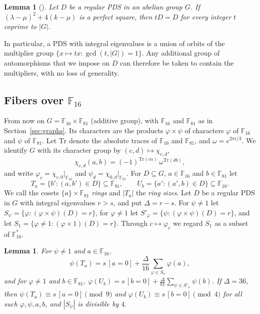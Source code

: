 \documentclass[11pt]{amsart}
\newtheorem{lemma}[theorem]{Lemma}
\theoremstyle{definition}
\newcommand{\F}{\mathbb{F}}
\begin{document}
\begin{lemma}[{\cite[Theorem~4.1]{Ma1994}}]\label{lem:mult}
Let $D$ be a regular PDS in an abelian group $G$. If $(\lambda-\mu)^2+4(k-\mu)$ is a perfect square, then $tD=D$ for every integer $t$ coprime to $|G|$.
\end{lemma}
In particular, a PDS with integral eigenvalues is a union of orbits of the multiplier group $\{x\mapsto tx:\gcd(t,|G|)=1\}$. Any additional group of automorphisms that we impose on $D$ can therefore be taken to contain the multipliers, with no loss of generality.

\subsection{Fibers over $\F_{16}$}\label{sec:fibrelemmas}
From now on $G=\F_{16}\times\F_{81}$ (additive group), with $\F_{16}$ and $\F_{81}$ as in Section~\ref{sec:graphs}. Its characters are the products $\varphi\times\psi$ of characters $\varphi$ of $\F_{16}$ and $\psi$ of $\F_{81}$. Let $\mathrm{Tr}$ denote the absolute traces of $\F_{16}$ and $\F_{81}$, and $\omega=e^{2\pi i/3}$. We identify $G$ with its character group by $(c,d)\mapsto\chi_{c,d}$,
\[
\chi_{c,d}(a,b)=(-1)^{\mathrm{Tr}(ca)}\,\omega^{\mathrm{Tr}(db)},
\]
and write $\varphi_c=\chi_{c,0}|_{\F_{16}}$ and $\psi_d=\chi_{0,d}|_{\F_{81}}$. For $D\subseteq G$, $a\in\F_{16}$ and $b\in\F_{81}$ let
\[
T_a=\{b':(a,b')\in D\}\subseteq\F_{81},\qquad U_b=\{a':(a',b)\in D\}\subseteq\F_{16}.
\]
We call the cosets $\{a\}\times\F_{81}$ \emph{rings} and $|T_a|$ the \emph{ring sizes}. Let $D$ be a regular PDS in $G$ with integral eigenvalues $r>s$, and put $\Delta=r-s$. For $\psi\ne1$ let $S_\psi=\{\varphi:(\varphi\times\psi)(D)=r\}$, for $\varphi\ne1$ let $S'_\varphi=\{\psi:(\varphi\times\psi)(D)=r\}$, and let $S_1=\{\varphi\ne1:(\varphi\times1)(D)=r\}$. Through $c\mapsto\varphi_c$ we regard $S_1$ as a subset of $\F_{16}^*$.

\begin{lemma}\label{lem:div}
For $\psi\ne1$ and $a\in\F_{16}$,
\begin{equation}\label{eq:fibre}
\psi(T_a)=s\,[a=0]+\frac{\Delta}{16}\sum_{\varphi\in S_\psi}\varphi(a),
\end{equation}
and for $\varphi\ne1$ and $b\in\F_{81}$, $\varphi(U_b)=s\,[b=0]+\frac{\Delta}{81}\sum_{\psi\in S'_\varphi}\psi(b)$. If $\Delta=36$, then $\psi(T_a)\equiv s\,[a=0]\pmod 9$ and $\varphi(U_b)\equiv s\,[b=0]\pmod 4$ for all such $\varphi,\psi,a,b$, and $|S_\psi|$ is divisible by $4$.
\end{lemma}
\end{document}
